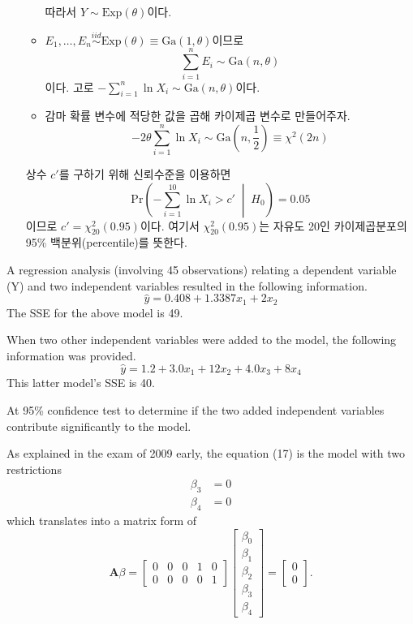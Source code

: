 \documentclass[answers]{exam}
\begin{document}
\begin{questions}
\begin{solution}
\begin{enumerate}
\begin{itemize}
$$        $$
        따라서 $Y \sim \mathrm{Exp}\left(\theta\right)$이다. 
        \item $E_{1},\ldots,E_{n}\overset{iid}{\sim} \mathrm{Exp}\left(\theta\right) \equiv \mathrm{Ga}\left(1,\theta\right)$이므로
        $$
          \sum_{i=1}^{n}E_{i} \sim \mathrm{Ga}\left(n,\theta\right)
        $$
        이다. 고로 $-\sum_{i=1}^{n}\ln X_{i} \sim \mathrm{Ga}\left(n,\theta\right)$이다.
        \item 감마 확률 변수에 적당한 값을 곱해 카이제곱 변수로 만들어주자.
        $$
          -2\theta\sum_{i=1}^{n}\ln X_{i} \sim \mathrm{Ga}\left(n,\dfrac{1}{2}\right) \equiv \chi^{2}\left(2n\right)
        $$
      \end{itemize}
      상수 $c'$를 구하기 위해 신뢰수준을 이용하면
      $$
        \mathrm{Pr}\left(-\sum_{i=1}^{10}\ln X_{i} > c'\;\middle|\;H_{0}\right) = 0.05
      $$
      이므로 $c' = \chi_{20}^{2}\left(0.95\right)$이다. 여기서 $\chi_{20}^{2}\left(0.95\right)$는 자유도 20인 카이제곱분포의 95\% 백분위(percentile)를 뜻한다.
    \end{enumerate}
   \end{solution}
   \question
   A regression analysis (involving 45 observations) relating a dependent variable (Y) and two independent variables resulted in the following information.
   \begin{equation}
    \hat{y} = 0.408+1.3387x_{1}+2x_{2}
   \end{equation}
   The SSE for the above model is 49.\par
   When two other independent variables were added to the model, the following information was provided.
   \begin{equation}
    \hat{y} = 1.2+3.0x_{1}+12x_{2}+4.0x_{3}+8x_{4}
   \end{equation}
   This latter model's SSE is 40.\par
   At 95\% confidence test to determine if the two added independent variables contribute significantly to the model. 
   \begin{solution}
    As explained in the exam of 2009 early, the equation (17) is the model with two restrictions
    \begin{align}
      \beta_{3} &= 0\\
      \beta_{4} &= 0
    \end{align}
    which translates into a matrix form of
    $$
      \mathbf{A}\beta = \begin{bmatrix}0 & 0 & 0 & 1 & 0\\ 0 & 0 & 0 & 0 & 1\end{bmatrix}\begin{bmatrix}\beta_{0}\\ \beta_{1}\\ \beta_{2} \\ \beta_{3} \\ \beta_{4}\end{bmatrix}=\begin{bmatrix}0 \\ 0\end{bmatrix}.
$$
\end{solution}
\end{questions}
\end{document}
